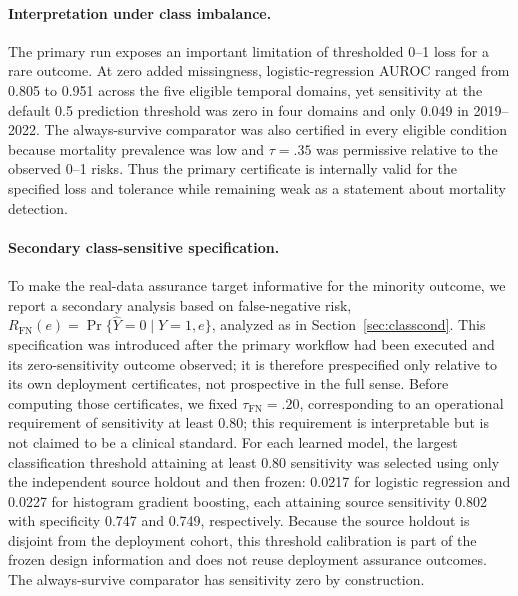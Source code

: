 \documentclass[twoside,11pt]{article}
\begin{document}
\begin{table}[t]
\centering\small
\caption{MIMIC-IV temporal-domain summary. Mortality prevalence, logistic-regression risk,
AUROC, and AUPRC are shown at zero added missingness. ``Max exact upper'' is the largest
exact-Bonferroni upper risk across the three models and four missingness levels in that domain.
The last column gives certified/total model-missingness conditions.}
\label{tab:mimic}

\end{table}

\paragraph{Interpretation under class imbalance.}
The primary run exposes an important limitation of thresholded 0--1 loss for a rare outcome.
At zero added missingness, logistic-regression AUROC ranged from 0.805 to 0.951 across the five
eligible temporal domains, yet sensitivity at the default 0.5 prediction threshold was zero in
four domains and only 0.049 in 2019--2022. The always-survive comparator was also certified in
every eligible condition because mortality prevalence was low and $\tau=.35$ was permissive
relative to the observed 0--1 risks. Thus the primary certificate is internally valid for the
specified loss and tolerance while remaining weak as a statement about mortality detection.

\paragraph{Secondary class-sensitive specification.}
To make the real-data assurance target informative for the minority outcome, we report a
secondary analysis based on false-negative risk,
$R_{\mathrm{FN}}(e)=\Pr\{\widehat Y=0\mid Y=1,e\}$, analyzed as in
Section~\ref{sec:classcond}. This specification was introduced after the primary workflow had
been executed and its zero-sensitivity outcome observed; it is therefore prespecified only
relative to its own deployment certificates, not prospective in the full sense. Before
computing those certificates, we fixed $\tau_{\mathrm{FN}}=.20$, corresponding to an
operational requirement of sensitivity at least 0.80; this requirement is interpretable but is
not claimed to be a clinical standard. For each learned model, the largest classification
threshold attaining at least 0.80 sensitivity was selected using only the independent source
holdout and then frozen: 0.0217 for logistic regression and 0.0227 for histogram gradient
boosting, each attaining source sensitivity 0.802 with specificity 0.747 and 0.749,
respectively. Because the source holdout is disjoint from the deployment cohort, this threshold
calibration is part of the frozen design information and does not reuse deployment assurance
outcomes. The always-survive comparator has sensitivity zero by construction.
\end{document}
